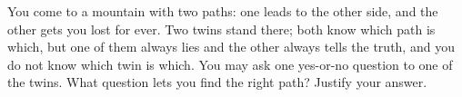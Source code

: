 You come to a mountain with two paths: one leads to the other side, and the other gets you lost for ever. Two twins stand there; both know which path is which, but one of them always lies and the other always tells the truth, and you do not know which twin is which. You may ask one yes-or-no question to one of the twins. What question lets you find the right path? Justify your answer.
